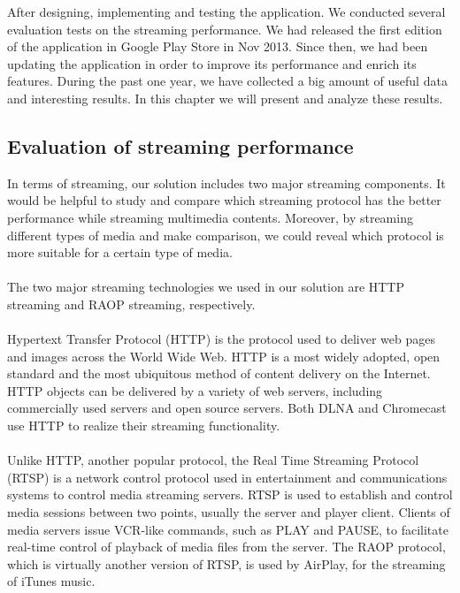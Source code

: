 
After designing, implementing and testing the application. We conducted several evaluation tests on the streaming performance. We had released the first edition of the application in Google Play Store in Nov 2013. Since then, we had been updating the application in order to improve its performance and enrich its features. During the past one year, we have collected a big amount of useful data and interesting results. In this chapter we will present and analyze these results.
\subsection{Evaluation of streaming performance}
In terms of streaming, our solution includes two major streaming components. It would be helpful to study and compare which streaming protocol has the better performance while streaming multimedia contents. Moreover, by streaming different types of media and make comparison, we could reveal which protocol is more suitable for a certain type of media. \\
\\The two major streaming technologies we used in our solution are HTTP streaming and RAOP streaming, respectively.\\
\\
Hypertext Transfer Protocol (HTTP) is the protocol used to deliver web pages and images across the World Wide Web. HTTP is a most widely adopted, open standard and the most ubiquitous method of content delivery on the Internet. HTTP objects can be delivered by a variety of web servers, including commercially used servers and open source servers. Both DLNA and Chromecast use HTTP to realize their streaming functionality.\\
\\
Unlike HTTP, another popular protocol, the Real Time Streaming Protocol (RTSP) is a network control protocol used in entertainment and communications systems to control media streaming servers. RTSP is used to establish and control media sessions between two points, usually the server and player client. Clients of media servers issue VCR-like commands, such as PLAY and PAUSE, to facilitate real-time control of playback of media files from the server.  The RAOP protocol, which is virtually another version of RTSP, is used by AirPlay, for the streaming of iTunes music.
